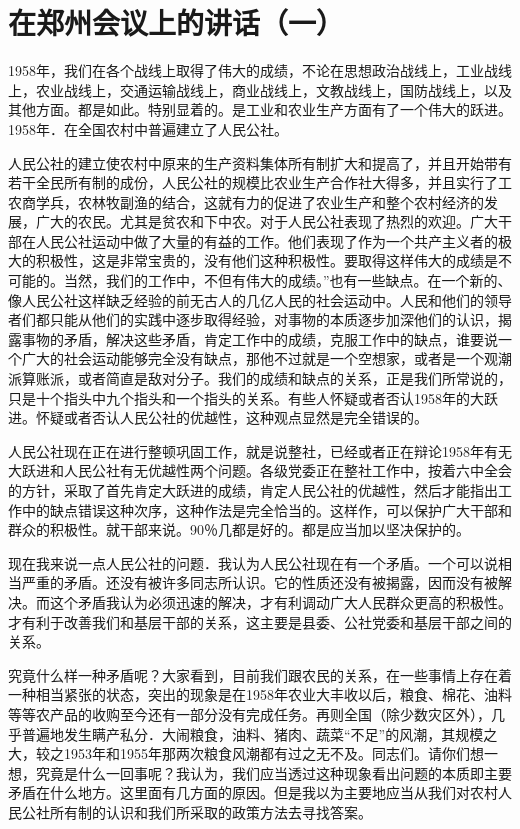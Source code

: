 \section[在郑州会议上的讲话（一）（一九五九年二月二十七日）]{在郑州会议上的讲话（一）}


1958年，我们在各个战线上取得了伟大的成绩，不论在思想政治战线上，工业战线上，农业战线上，交通运输战线上，商业战线上，文教战线上，国防战线上，以及其他方面。都是如此。特别显着的。是工业和农业生产方面有了一个伟大的跃进。1958年．在全国农村中普遍建立了人民公社。

人民公社的建立使农村中原来的生产资料集体所有制扩大和提高了，并且开始带有若干全民所有制的成份，人民公社的规模比农业生产合作社大得多，并且实行了工农商学兵，农林牧副渔的结合，这就有力的促进了农业生产和整个农村经济的发展，广大的农民。尤其是贫农和下中农。对于人民公社表现了热烈的欢迎。广大干部在人民公社运动中做了大量的有益的工作。他们表现了作为一个共产主义者的极大的积极性，这是非常宝贵的，没有他们这种积极性。要取得这样伟大的成绩是不可能的。当然，我们的工作中，不但有伟大的成绩。”也有一些缺点。在一个新的、像人民公社这样缺乏经验的前无古人的几亿人民的社会运动中。人民和他们的领导者们都只能从他们的实践中逐步取得经验，对事物的本质逐步加深他们的认识，揭露事物的矛盾，解决这些矛盾，肯定工作中的成绩，克服工作中的缺点，谁要说一个广大的社会运动能够完全没有缺点，那他不过就是一个空想家，或者是一个观潮派算账派，或者简直是敌对分子。我们的成绩和缺点的关系，正是我们所常说的，只是十个指头中九个指头和一个指头的关系。有些人怀疑或者否认1958年的大跃进。怀疑或者否认人民公社的优越性，这种观点显然是完全错误的。

人民公社现在正在进行整顿巩固工作，就是说整社，已经或者正在辩论1958年有无大跃进和人民公社有无优越性两个问题。各级党委正在整社工作中，按着六中全会的方针，采取了首先肯定大跃进的成绩，肯定人民公社的优越性，然后才能指出工作中的缺点错误这种次序，这种作法是完全恰当的。这样作，可以保护广大干部和群众的积极性。就干部来说。90％几都是好的。都是应当加以坚决保护的。

现在我来说一点人民公社的问题．我认为人民公社现在有一个矛盾。一个可以说相当严重的矛盾。还没有被许多同志所认识。它的性质还没有被揭露，因而没有被解决。而这个矛盾我认为必须迅速的解决，才有利调动广大人民群众更高的积极性。才有利于改善我们和基层干部的关系，这主要是县委、公社党委和基层干部之间的关系。

究竟什么样一种矛盾呢？大家看到，目前我们跟农民的关系，在一些事情上存在着一种相当紧张的状态，突出的现象是在1958年农业大丰收以后，粮食、棉花、油料等等农产品的收购至今还有一部分没有完成任务。再则全国（除少数灾区外），几乎普遍地发生瞒产私分．大闹粮食，油料、猪肉、蔬菜“不足”的风潮，其规模之大，较之1953年和1955年那两次粮食风潮都有过之无不及。同志们。请你们想一想，究竟是什么一回事呢？我认为，我们应当透过这种现象看出问题的本质即主要矛盾在什么地方。这里面有几方面的原因。但是我以为主要地应当从我们对农村人民公社所有制的认识和我们所采取的政策方法去寻找答案。

